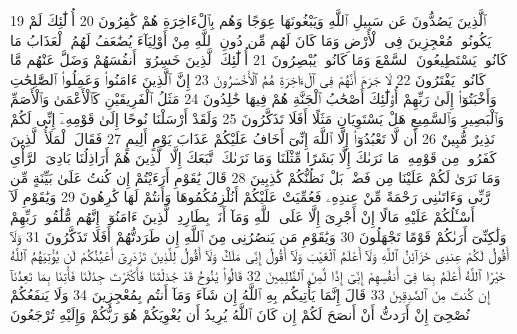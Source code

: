 {\tiny\colorbox{cl_aya}{19}} ٱلَّذِينَ يَصُدُّونَ عَن سَبِيلِ ٱللَّهِ وَيَبْغُونَهَا عِوَجًا وَهُم بِٱلْءَاخِرَةِ هُمْ كَٰفِرُونَ
{\tiny\colorbox{cl_aya}{20}} أُو۟لَٰٓئِكَ لَمْ يَكُونُوا۟ مُعْجِزِينَ فِى ٱلْأَرْضِ وَمَا كَانَ لَهُم مِّن دُونِ ٱللَّهِ مِنْ أَوْلِيَآءَ يُضَٰعَفُ لَهُمُ ٱلْعَذَابُ مَا كَانُوا۟ يَسْتَطِيعُونَ ٱلسَّمْعَ وَمَا كَانُوا۟ يُبْصِرُونَ
{\tiny\colorbox{cl_aya}{21}} أُو۟لَٰٓئِكَ ٱلَّذِينَ خَسِرُوٓا۟ أَنفُسَهُمْ وَضَلَّ عَنْهُم مَّا كَانُوا۟ يَفْتَرُونَ
{\tiny\colorbox{cl_aya}{22}} لَا جَرَمَ أَنَّهُمْ فِى ٱلْءَاخِرَةِ هُمُ ٱلْأَخْسَرُونَ
{\tiny\colorbox{cl_aya}{23}} إِنَّ ٱلَّذِينَ ءَامَنُوا۟ وَعَمِلُوا۟ ٱلصَّٰلِحَٰتِ وَأَخْبَتُوٓا۟ إِلَىٰ رَبِّهِمْ أُو۟لَٰٓئِكَ أَصْحَٰبُ ٱلْجَنَّةِ هُمْ فِيهَا خَٰلِدُونَ
{\tiny\colorbox{cl_aya}{24}} مَثَلُ ٱلْفَرِيقَيْنِ كَٱلْأَعْمَىٰ وَٱلْأَصَمِّ وَٱلْبَصِيرِ وَٱلسَّمِيعِ هَلْ يَسْتَوِيَانِ مَثَلًا أَفَلَا تَذَكَّرُونَ
{\tiny\colorbox{cl_aya}{25}} وَلَقَدْ أَرْسَلْنَا نُوحًا إِلَىٰ قَوْمِهِۦٓ إِنِّى لَكُمْ نَذِيرٌ مُّبِينٌ
{\tiny\colorbox{cl_aya}{26}} أَن لَّا تَعْبُدُوٓا۟ إِلَّا ٱللَّهَ إِنِّىٓ أَخَافُ عَلَيْكُمْ عَذَابَ يَوْمٍ أَلِيمٍ
{\tiny\colorbox{cl_aya}{27}} فَقَالَ ٱلْمَلَأُ ٱلَّذِينَ كَفَرُوا۟ مِن قَوْمِهِۦ مَا نَرَىٰكَ إِلَّا بَشَرًا مِّثْلَنَا وَمَا نَرَىٰكَ ٱتَّبَعَكَ إِلَّا ٱلَّذِينَ هُمْ أَرَاذِلُنَا بَادِىَ ٱلرَّأْىِ وَمَا نَرَىٰ لَكُمْ عَلَيْنَا مِن فَضْلٍۭ بَلْ نَظُنُّكُمْ كَٰذِبِينَ
{\tiny\colorbox{cl_aya}{28}} قَالَ يَٰقَوْمِ أَرَءَيْتُمْ إِن كُنتُ عَلَىٰ بَيِّنَةٍ مِّن رَّبِّى وَءَاتَىٰنِى رَحْمَةً مِّنْ عِندِهِۦ فَعُمِّيَتْ عَلَيْكُمْ أَنُلْزِمُكُمُوهَا وَأَنتُمْ لَهَا كَٰرِهُونَ
{\tiny\colorbox{cl_aya}{29}} وَيَٰقَوْمِ لَآ أَسْـَٔلُكُمْ عَلَيْهِ مَالًا إِنْ أَجْرِىَ إِلَّا عَلَى ٱللَّهِ وَمَآ أَنَا۠ بِطَارِدِ ٱلَّذِينَ ءَامَنُوٓا۟ إِنَّهُم مُّلَٰقُوا۟ رَبِّهِمْ وَلَٰكِنِّىٓ أَرَىٰكُمْ قَوْمًا تَجْهَلُونَ
{\tiny\colorbox{cl_aya}{30}} وَيَٰقَوْمِ مَن يَنصُرُنِى مِنَ ٱللَّهِ إِن طَرَدتُّهُمْ أَفَلَا تَذَكَّرُونَ
{\tiny\colorbox{cl_aya}{31}} وَلَآ أَقُولُ لَكُمْ عِندِى خَزَآئِنُ ٱللَّهِ وَلَآ أَعْلَمُ ٱلْغَيْبَ وَلَآ أَقُولُ إِنِّى مَلَكٌ وَلَآ أَقُولُ لِلَّذِينَ تَزْدَرِىٓ أَعْيُنُكُمْ لَن يُؤْتِيَهُمُ ٱللَّهُ خَيْرًا ٱللَّهُ أَعْلَمُ بِمَا فِىٓ أَنفُسِهِمْ إِنِّىٓ إِذًا لَّمِنَ ٱلظَّٰلِمِينَ
{\tiny\colorbox{cl_aya}{32}} قَالُوا۟ يَٰنُوحُ قَدْ جَٰدَلْتَنَا فَأَكْثَرْتَ جِدَٰلَنَا فَأْتِنَا بِمَا تَعِدُنَآ إِن كُنتَ مِنَ ٱلصَّٰدِقِينَ
{\tiny\colorbox{cl_aya}{33}} قَالَ إِنَّمَا يَأْتِيكُم بِهِ ٱللَّهُ إِن شَآءَ وَمَآ أَنتُم بِمُعْجِزِينَ
{\tiny\colorbox{cl_aya}{34}} وَلَا يَنفَعُكُمْ نُصْحِىٓ إِنْ أَرَدتُّ أَنْ أَنصَحَ لَكُمْ إِن كَانَ ٱللَّهُ يُرِيدُ أَن يُغْوِيَكُمْ هُوَ رَبُّكُمْ وَإِلَيْهِ تُرْجَعُونَ
